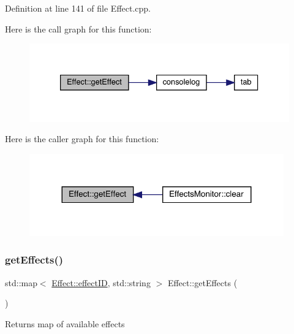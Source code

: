 Definition at line 141 of file Effect.\+cpp.

Here is the call graph for this function\+:
\nopagebreak
\begin{figure}[H]
\begin{center}
\leavevmode
\includegraphics[width=333pt]{class_effect_a32185d446a9dc77963a322b64d2f9e27_cgraph}
\end{center}
\end{figure}
Here is the caller graph for this function\+:
\nopagebreak
\begin{figure}[H]
\begin{center}
\leavevmode
\includegraphics[width=311pt]{class_effect_a32185d446a9dc77963a322b64d2f9e27_icgraph}
\end{center}
\end{figure}
\mbox{\label{class_effect_a2165f76956c91baf1482d2405eb1ed4e}} 
\subsubsection{\texorpdfstring{get\+Effects()}{getEffects()}}
{\footnotesize\ttfamily std\+::map$<$ \hyperlink{class_effect_a6422fe21e9e452943fbc3344884a6fed}{Effect\+::effect\+ID}, std\+::string $>$ Effect\+::get\+Effects (\begin{DoxyParamCaption}{ }\end{DoxyParamCaption})\hspace{0.3cm}{\ttfamily [static]}}

\begin{DoxyReturn}{Returns}
map of available effects 
\end{DoxyReturn}



